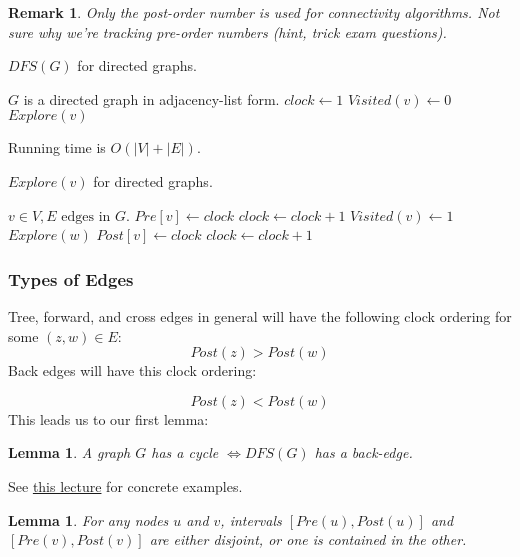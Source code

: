 \documentclass{article}
\newtheorem{lemma}[theorem]{Lemma}
\newtheorem{remark}{Remark}
\theoremstyle{definition}
\begin{document}
\begin{remark}
	Only the post-order number is used for connectivity algorithms. Not sure why we're tracking
	pre-order numbers (hint, trick exam questions).
\end{remark}

\begin{algorithm}
\label{alg:dfs_dir}
\caption{$DFS(G)$ for directed graphs.}
\begin{algorithmic}[1]
\REQUIRE $G$ is a directed graph in adjacency-list form.
\STATE $clock \gets 1$ 
\STATE $Visited(v) \gets 0$
\ENDFOR
{}
\STATE $Explore(v)$
\ENDIF
\ENDFOR
\end{algorithmic}
 Running time is $O(|V|+|E|)$.
\end{algorithm}

\begin{algorithm}
\caption{$Explore(v)$ for directed graphs.}
\begin{algorithmic}[1]
\REQUIRE $v \in V, E \text{ edges in } G$.
\STATE$Pre[v] \gets clock$ 
\STATE $clock \gets clock + 1$
\STATE $Visited(v) \gets 1$
\STATE $Explore(w)$
\STATE $Post[v] \gets clock$ 
\STATE $clock \gets clock + 1$
\ENDIF
\ENDFOR
\end{algorithmic}
\end{algorithm}

\subsubsection{Types of Edges}
Tree, forward, and cross edges in general will have the following clock ordering for some $(z,w) \in E$: $$Post(z) > Post(w)$$ Back edges will have this clock ordering:

$$Post(z) < Post(w)$$ This leads us to our first lemma:
\begin{lemma}
\label{cycle}
	A graph $G$ has a cycle $\iff DFS(G)$ has a back-edge.
\end{lemma}

See \href{https://classroom.udacity.com/courses/ud401/lessons/10159691481/concepts/101975518340923}{this lecture} for concrete examples. 

\begin{lemma}
\label{containment}
For any nodes $u$ and $v$, intervals $[ Pre(u), Post(u) ]$ and $[Pre(v), Post(v)]$ are either disjoint, or one is contained in the other.
\end{lemma}
\end{document}
